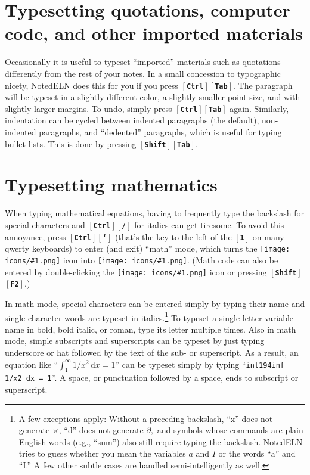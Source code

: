 \documentclass[11pt]{report}
\def\keystroke#1{$\left[\right.\!${\tt\bfseries #1}$\!\left.\right]$}
\def\key#1{\keystroke{#1}}
\def\keycombo#1#2{\keystroke{#1}\keystroke{#2}}
\def\keycontrol#1{\keycombo{Ctrl}{#1}}
\def\keyshift#1{\keycombo{Shift}{#1}}
\def\icon#1{\raise-2pt\hbox{\texttt{[image: icons/\#1.png]}}}
\begin{document}
\section{Typesetting quotations, computer code, and other imported materials}

Occasionally it is useful to typeset ``imported'' materials such as
quotations differently from the rest of your notes. In a small
concession to typographic nicety, NotedELN does this for you if you press
\keycontrol{Tab}.  The paragraph will be typeset in a slightly
different color, a slightly smaller point size, and with slightly
larger margins. To undo, simply press \keycontrol{Tab}
again. Similarly, indentation can be cycled between indented
paragraphs (the default), non-indented paragraphs, and ``dedented''
paragraphs, which is useful for typing bullet lists. This is done by
pressing \keyshift{Tab}.

\section{Typesetting mathematics}

When typing mathematical equations, having to frequently type the backslash for special characters and \keycontrol{/} for
italics can get tiresome. To avoid this annoyance, press
\keycontrol{`} (that's the key to the left of the \key{1} on many
qwerty keyboards) to enter (and exit) ``math'' mode, which turns the
\icon{type} icon into \icon{type-math}. (Math code can
also be entered by double-clicking the \icon{type} icon
or pressing \keyshift{F2}.)

In math mode, special characters can be entered simply by typing their
name and single-character words are typeset in italics.\footnote{A few
  exceptions apply: Without a preceding backslash, ``x'' does not
  generate $\times$, ``d'' does not generate $\partial,$ and symbols
  whose commands are plain English words (e.g., ``sum'') also still
  require typing the backslash. NotedELN tries to guess whether you
  mean the variables $a$ and $I$ or the words ``a'' and ``I.'' A few
  other subtle cases are handled semi-intelligently as well.} To
typeset a single-letter variable name in bold, bold italic, or roman,
type its letter multiple times. Also in math mode, simple subscripts
and superscripts can be typeset by just typing underscore or hat
followed by the text of the sub- or superscript. As a result, an
equation like ``$\int_1^\infty 1/x^2\, \mathrm{d}x = 1$'' can be
typeset simply by typing ``{\tt{int1\char94inf 1/x2
    dx = 1}}''. A space, or punctuation followed by a space, ends to
subscript or superscript.
\end{document}
